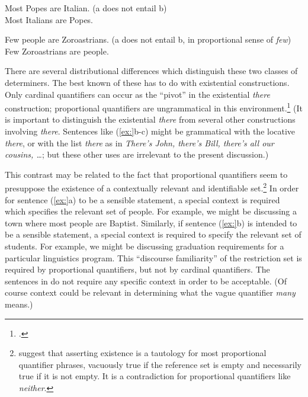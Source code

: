 \ea
\ea  Most Popes are Italian.   (a does not entail b)\\
\ex Most Italians are Popes.
\z \z

\ea
\ea Few people are Zoroastrians.   (a does not entail b, in proportional sense of \textit{few})\\
\ex Few Zoroastrians are people.
                       \z
\z


There are several distributional differences which distinguish these two classes of determiners. The best known of these has to do with existential constructions. Only cardinal quantifiers can occur as the “pivot” in the existential \textit{there} construction; proportional quantifiers are ungrammatical in this environment.\footnote{\citet{Milsark1977}.} (It is important to distinguish the existential \textit{there} from several other constructions involving \textit{there}. Sentences like (\ref{ex:}b-c) might be grammatical with the locative \textit{there}, or with the list \textit{there} as in \textit{There’s John, there’s Bill, there’s all our cousins, …}; but these other uses are irrelevant to the present discussion.)


\ea
{}
                       \z
\z


This contrast may be related to the fact that proportional quantifiers seem to presuppose the existence of a contextually relevant and identifiable set.\footnote{\citet{BarwiseCooper1981} suggest that asserting existence is a tautology for most proportional quantifier phrases, vacuously true if the reference set is empty and necessarily true if it is not empty. It is a contradiction for proportional quantifiers like \textit{neither}.} In order for sentence (\ref{ex:}a) to be a sensible statement, a special context is required which specifies the relevant set of people. For example, we might be discussing a town where most people are Baptist. Similarly, if sentence (\ref{ex:}b) is intended to be a sensible statement, a special context is required to specify the relevant set of students. For example, we might be discussing graduation requirements for a particular linguistics program. This “discourse familiarity” of the restriction set is required by proportional quantifiers, but not by cardinal quantifiers. The sentences in  do not require any specific context in order to be acceptable. (Of course context could be relevant in determining what the vague quantifier \textit{many} means.)



